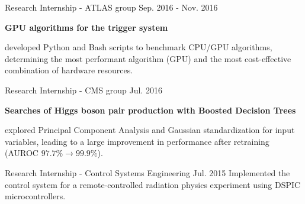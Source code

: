 \begin{cventries}
    {Research Internship - ATLAS group}
    {}
    {Sep. 2016 - Nov. 2016}
    {   
        \textbf{GPU algorithms for the trigger system}\vspace{14pt}
        \begin{cvitems}
            \item {developed Python and Bash scripts to benchmark CPU/GPU algorithms, determining the most performant algorithm (GPU) and the most cost-effective combination of hardware resources.}
        \end{cvitems}
    }

    {Research Internship - CMS group}
    {}
    {Jul. 2016}
    {
        \textbf{Searches of Higgs boson pair production with Boosted Decision Trees}\vspace{14pt}
        \begin{cvitems}
            \item {explored Principal Component Analysis and Gaussian standardization for input variables, leading to a large improvement in performance after retraining (AUROC $97.7\% \to 99.9\%$).}
        \end{cvitems}
    }

    {Research Internship - Control Systems Engineering}
    {}
    {Jul. 2015}
    {Implemented the control system for a remote-controlled radiation physics experiment using DSPIC microcontrollers.}

\end{cventries}